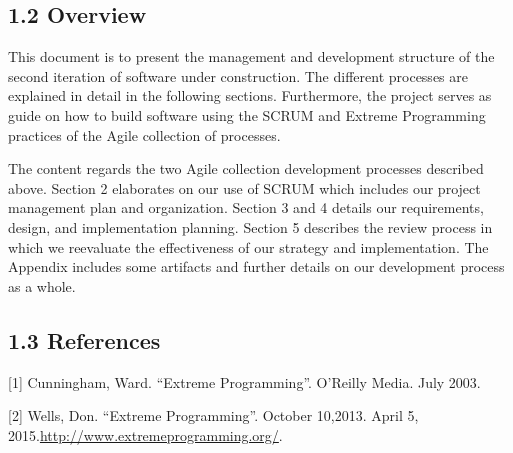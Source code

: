 \documentclass[]{article}
\begin{document}
\subsection{1.2 Overview}\label{overview}

This document is to present the management and development structure of
the second iteration of software under construction. The different
processes are explained in detail in the following sections.
Furthermore, the project serves as guide on how to build software using
the SCRUM and Extreme Programming practices of the Agile collection of
processes.

The content regards the two Agile collection development processes
described above. Section 2 elaborates on our use of SCRUM which includes
our project management plan and organization. Section 3 and 4 details
our requirements, design, and implementation planning. Section 5
describes the review process in which we reevaluate the effectiveness of
our strategy and implementation. The Appendix includes some artifacts
and further details on our development process as a whole.

\subsection{1.3 References}\label{references}

{[}1{]} Cunningham, Ward. ``Extreme Programming''. O'Reilly Media. July
2003.

{[}2{]} Wells, Don. ``Extreme Programming''. October 10,2013. April 5,
2015.\url{http://www.extremeprogramming.org/}.
\end{document}
